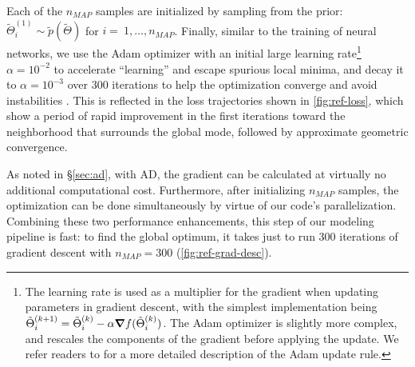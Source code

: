 Each of the $n_{MAP}$ samples are initialized by sampling from the prior: $\tilde{\Theta}_i^{(1)} \sim \tilde{p}(\tilde{\Theta})$ for $i=~1,\ldots, n_{MAP}$. 
Finally, similar to the training of neural networks, we use the Adam optimizer \citep{kingma2017} with an initial large learning rate\footnote{The learning rate is used as a multiplier for the gradient when updating parameters in gradient descent, with the simplest implementation being $\tilde{\Theta}^{(k+1)}_i=\tilde{\Theta}^{(k)}_i-\alpha \grad f(\tilde{\Theta}^{(k)}_i)$. The Adam optimizer is slightly more complex, and rescales the components of the gradient before applying the update. We refer readers to \citet{kingma2017} for a more detailed description of the Adam update rule.} $\alpha=10^{-2}$ to accelerate 
``learning'' and escape spurious local minima, and decay it to $\alpha=10^{-3}$ over 300 iterations to help the optimization converge and avoid instabilities \citep{you2019}. This is reflected in the loss trajectories shown in \cref{fig:ref-loss}, which show a period of rapid improvement in the first  iterations toward the neighborhood that surrounds the global mode, followed by approximate geometric convergence. 


As noted in \S\ref{sec:ad}, with AD,
the gradient can be calculated at virtually no additional computational cost. 
Furthermore, after initializing $n_{MAP}$ samples, the optimization can be done simultaneously by virtue of our code's parallelization. 
Combining these two performance enhancements, this step of our modeling pipeline is fast: 
to find the global optimum, it takes just  to run 300 iterations of gradient descent with $n_{MAP}=300$ (\cref{fig:ref-grad-desc}). 

